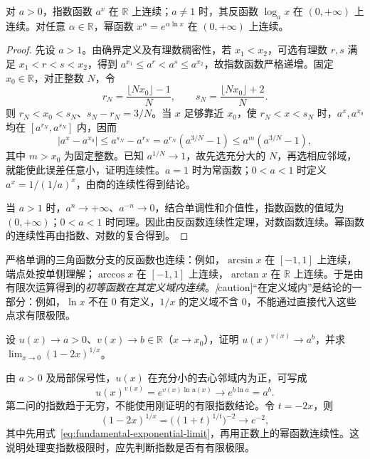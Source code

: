 \documentclass[UTF8,12pt,a4paper,fontset=fandol]{ctexbook}
\begin{document}
\begin{proposition}[指数、对数与幂函数的连续性]
\label{prop:continuity-of-exponential-logarithmic-power-functions}
对 $a>0$，指数函数 $a^x$ 在 $\mathbb{R}$ 上连续；$a\neq1$ 时，其反函数 $\log_a x$ 在 $(0,+\infty)$ 上连续。对任意 $\alpha\in\mathbb{R}$，幂函数 $x^\alpha=e^{\alpha\ln x}$ 在 $(0,+\infty)$ 上连续。
\end{proposition}

\begin{proof}
先设 $a>1$。由确界定义及有理数稠密性，若 $x_1<x_2$，可选有理数 $r,s$ 满足 $x_1<r<s<x_2$，得到 $a^{x_1}\leq a^r<a^s\leq a^{x_2}$，故指数函数严格递增。固定 $x_0\in\mathbb{R}$，对正整数 $N$，令
\[
    r_N=\frac{\lfloor Nx_0\rfloor-1}{N},
    \qquad s_N=\frac{\lfloor Nx_0\rfloor+2}{N}.
\]
则 $r_N<x_0<s_N$、$s_N-r_N=3/N$。当 $x$ 足够靠近 $x_0$，使 $r_N<x<s_N$ 时，$a^x,a^{x_0}$ 均在 $[a^{r_N},a^{s_N}]$ 内，因而
\[
    |a^x-a^{x_0}|\leq a^{s_N}-a^{r_N}
    =a^{r_N}(a^{3/N}-1)\leq a^m(a^{3/N}-1),
\]
其中 $m>x_0$ 为固定整数。已知 $a^{1/N}\to1$，故先选充分大的 $N$，再选相应邻域，就能使此误差任意小，证明连续性。$a=1$ 时为常函数；$0<a<1$ 时定义 $a^x=1/(1/a)^x$，由商的连续性得到结论。

当 $a>1$ 时，$a^n\to+\infty$、$a^{-n}\to0$，结合单调性和介值性，指数函数的值域为 $(0,+\infty)$；$0<a<1$ 时同理。因此由反函数连续性定理，对数函数连续。幂函数的连续性再由指数、对数的复合得到。
\end{proof}

严格单调的三角函数分支的反函数也连续：例如，$\arcsin x$ 在 $[-1,1]$ 上连续，端点处按单侧理解；$\arccos x$ 在 $[-1,1]$ 上连续，$\arctan x$ 在 $\mathbb{R}$ 上连续。于是由有限次运算得到的\emph{初等函数在其定义域内连续}。\emph[caution]{“在定义域内”是结论的一部分：例如，$\ln x$ 不在 $0$ 有定义，$1/x$ 的定义域不含 $0$，不能通过直接代入这些点求有限极限。}

\begin{example}
\label{ex:variable-exponent-function-limit}
设 $u(x)\to a>0$、$v(x)\to b\in\mathbb{R}$（$x\to x_0$），证明 $u(x)^{v(x)}\to a^b$，并求 $\lim_{x\to0}(1-2x)^{1/x}$。
\end{example}

\begin{solve}
由 $a>0$ 及局部保号性，$u(x)$ 在充分小的去心邻域内为正，可写成
\[
    u(x)^{v(x)}=e^{v(x)\ln u(x)}\to e^{b\ln a}=a^b.
\]
第二问的指数趋于无穷，不能使用刚证明的有限指数结论。令 $t=-2x$，则
\[
    (1-2x)^{1/x}=\bigl((1+t)^{1/t}\bigr)^{-2}\to e^{-2},
\]
其中先用式~\eqref{eq:fundamental-exponential-limit}，再用正数上的幂函数连续性。这说明处理变指数极限时，应先判断指数是否有有限极限。
\end{solve}
\end{document}
